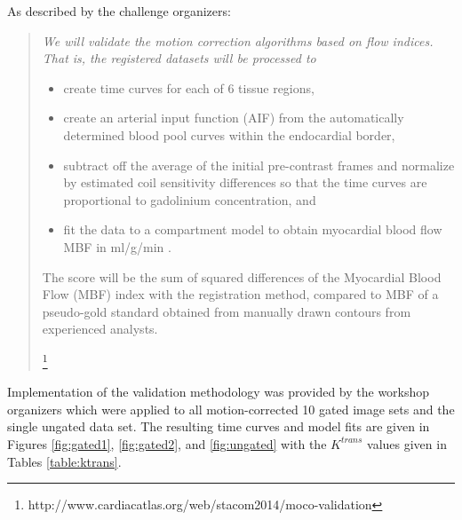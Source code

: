 \documentclass{llncs}
\begin{document}
As described by the challenge organizers:
\begin{quote}
{\it
We will validate the motion correction algorithms based on flow indices. 
That is, the registered datasets will be processed to
\begin{itemize}
\item create time curves for each of 6 tissue regions,
\item create an arterial input function (AIF) from the automatically determined 
blood pool curves within the endocardial border,
\item subtract off the average of the initial pre-contrast frames and 
normalize by estimated coil sensitivity differences so that the time curves 
are proportional to gadolinium concentration, and
\item fit the data to a compartment model to obtain myocardial blood flow MBF in 
ml/g/min  \cite{pack2010}.
\end{itemize}
The score will be the sum of squared differences of the Myocardial Blood 
Flow (MBF) index with the registration method, compared to MBF of a 
pseudo-gold standard obtained from manually drawn contours from experienced 
analysts.}%
\footnote{
http://www.cardiacatlas.org/web/stacom2014/moco-validation
}
\end{quote}
Implementation of the validation methodology was provided by the workshop 
organizers which were applied to all motion-corrected 10 gated image sets and the 
single ungated data set.  The resulting time curves and model fits are
given in Figures \ref{fig:gated1}, \ref{fig:gated2}, and \ref{fig:ungated} with
the $K^{trans}$ values given in Tables \ref{table:ktrans}.
\end{document}
